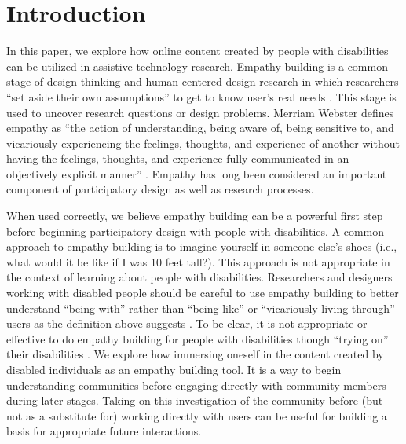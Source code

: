 \section{Introduction}
In this paper, we explore how online content created by people with disabilities can be utilized in assistive technology research. Empathy building is a common stage of design thinking and human centered design research in which researchers ``set aside their own assumptions'' to get to know user's real needs \cite{plattnerDesignThinkingUnderstand2011,wrightEmpathyExperienceHCI2008}. This stage is used to uncover research questions or design problems. Merriam Webster defines empathy as ``the action of understanding, being aware of, being sensitive to, and vicariously experiencing the feelings, thoughts, and experience of another without having the feelings, thoughts, and experience fully communicated in an objectively explicit manner'' \cite{inc.MeriamWebsterDictionaryDefinition2004}. Empathy has long been considered an important component of participatory design as well as research processes. %

When used correctly, we believe empathy building can be a powerful first step before beginning participatory design with people with disabilities. A common approach to empathy building is to imagine yourself in someone else's shoes (i.e., what would it be like if I was 10 feet tall?). This approach is not appropriate in the context of learning about people with disabilities. Researchers and designers working with disabled people should be careful to use empathy building to better understand ``being with'' rather than ``being like'' or ``vicariously living through'' users as the definition above suggests \cite{bennettPromiseEmpathyDesign2019}. To be clear, it is not appropriate or effective to do empathy building for people with disabilities though ``trying on'' their disabilities \cite{abreuWhyWonTry2018}.  
We explore how immersing oneself in the content created by disabled individuals as an empathy building tool. It is a way to begin understanding communities before engaging directly with community members during later stages. Taking on this investigation of the community before (but not as a substitute for) working directly with users can be useful for building a basis for appropriate future interactions. 

